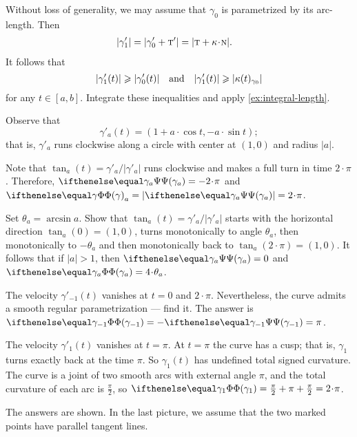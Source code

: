 \begin{multicols}{2}

\setcounter{eqtn}{0}



Without loss of generality, we may assume that $\gamma_0$ is parametrized by its arc-length.
Then
\begin{align*}
|\gamma_1'|&=|\gamma_0'+\tan'|=|\tan+\kur\cdot\norm|.
\end{align*}
It follows that
\[|\gamma_1'(t)|\geqslant|\gamma_0'(t)|
\quad\text{and}\quad
|\gamma_1'(t)|\geqslant|\kappa(t)_{\gamma_0}|
\]
for any $t\in[a,b]$.
Integrate these inequalities and apply 
\ref{ex:integral-length}.


Observe that 
\[\gamma'_a(t)=(1+a\cdot \cos t, -a\cdot \sin t);\]
that is, $\gamma'_a$ runs clockwise along a circle with center at $(1,0)$ and radius $\vert a \vert$.

 Note that $\tan_a(t)=\gamma'_a/|\gamma'_a|$ runs clockwise and makes a full turn in time $2\cdot\pi$.
Therefore, $\tgc{\gamma_a}=-2\cdot\pi$ and $\tc\gamma_a\z=|\tgc{\gamma_a}|=2\cdot\pi$.

Set $\theta_a=\arcsin a$.
Show that $\tan_a(t)=\gamma'_a/|\gamma'_a|$ starts with the horizontal direction $\tan_a(0)=(1,0)$, turns monotonically to angle $\theta_a$, then monotonically to $-\theta_a$ and then monotonically back to $\tan_a(2\cdot\pi)=(1,0)$.
It follows that if $|a|>1$, then
$\tgc{\gamma_a}=0$ and $\tc{\gamma_a}=4\cdot\theta_a$.

The velocity $\gamma'_{-1}(t)$ vanishes at $t=0$ and $2\cdot\pi$.
Nevertheless, the curve admits a smooth regular parametrization --- find it.
The answer is $\tc{\gamma_{-1}}=-\tgc{\gamma_{-1}}=\pi$.

The velocity $\gamma'_1(t)$ vanishes at $t=\pi$.
At $t=\pi$ the curve has a cusp;
that is, $\gamma_1$ turns exactly back at the time $\pi$.
So $\gamma_1(t)$ has undefined total signed curvature.
The curve is a joint of two smooth arcs with external angle $\pi$, and
the total curvature of each arc is $\tfrac\pi2$, so 
$\tc{\gamma_{1}}=\tfrac\pi2+\pi+\tfrac\pi2=2\cdot\pi$.


The answers are shown.
In the last picture, we assume that the two marked points have parallel tangent lines.


\end{multicols}
